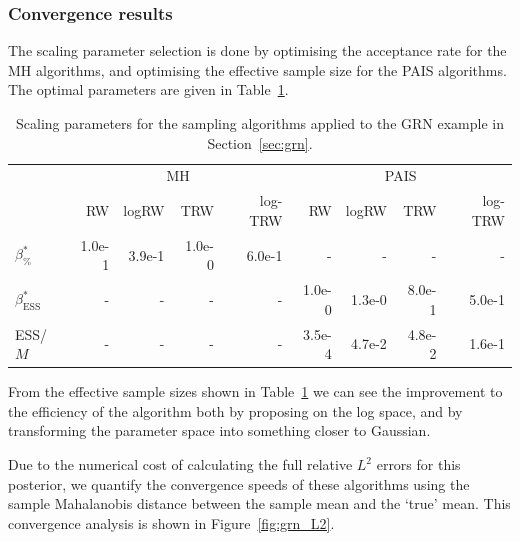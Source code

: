 \documentclass[final]{siamltex}
\begin{document}
\subsubsection{Convergence results}

The scaling parameter selection is done by optimising the acceptance rate for the MH algorithms, and optimising the effective sample size for the PAIS algorithms. The optimal parameters are given in Table~\ref{tab:grn_scaling_parameters}.

\begin{table}[!h]
	\centering
	\begin{tabular}{lrrrrrrrr}
	\toprule
		 & \multicolumn{4}{c}{MH} & \multicolumn{4}{c}{PAIS} \\ \cmidrule(lr){2-5} \cmidrule(lr){6-9}
		& RW & logRW & TRW & log-TRW & RW & logRW & TRW & log-TRW \\ \midrule
		$\beta_{\%}^*$	 	& 1.0e-1 & 3.9e-1 & 1.0e-0 &6.0e-1 & - & - & - & - \\
		$\beta_{\text{ESS}}^*$	& - 	        & -           & -            & -            & 1.0e-0 & 1.3e-0 & 8.0e-1 & 5.0e-1 \\
		ESS/$M$		 		& - 	        & -           & -            & -            & 3.5e-4 & 4.7e-2 & 4.8e-2 & 1.6e-1  \\
	\bottomrule
	\end{tabular}
	\caption{Scaling parameters for the sampling algorithms applied to the GRN example in Section~\ref{sec:grn}.}
	\label{tab:grn_scaling_parameters}
\end{table}

From the effective sample sizes shown in Table~\ref{tab:grn_scaling_parameters} we can see the improvement to the efficiency of the algorithm both by proposing on the log space, and by transforming the parameter space into something closer to Gaussian.

Due to the numerical cost of calculating the full relative $L^2$ errors for this posterior, we quantify the convergence speeds of these algorithms using the sample Mahalanobis distance between the sample mean and the `true' mean. This convergence analysis is shown in Figure~\ref{fig:grn_L2}.
\end{document}
